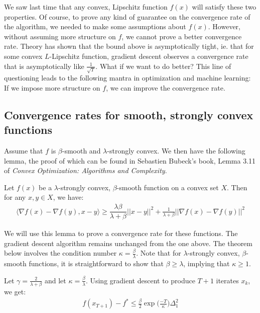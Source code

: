\documentclass[12pt]{report}
\begin{document}
We saw last time that any convex, Lipschitz function $f(x)$ will satisfy these two properties. Of course, to prove any kind of guarantee on the convergence rate of the algorithm, we needed to make some assumptions about $f(x)$. However, without assuming more structure on $f$, we cannot prove a better convergence rate. Theory has shown that the bound above is asymptotically tight, ie. that for some convex $L$-Lipschitz function, gradient descent observes a convergence rate that is asymptotically like $\frac{1}{\sqrt{T}}$. What if we want to do better? This line of questioning leads to the following mantra in optimization and machine learning: If we impose more structure on $f$, we can improve the convergence rate.

\subsection{Convergence rates for smooth, strongly convex functions}

Assume that $f$ is $\beta$-smooth and $\lambda$-strongly convex. We then have the following lemma, the proof of which can be found in Sebastien Bubeck's book, Lemma 3.11 of {\it Convex Optimization: Algorithms and Complexity}.

\begin{lemma}
Let $f(x)$ be a $\lambda$-strongly convex, $\beta$-smooth function on a convex set $X$. Then for any $x,y \in X$, we have:
\begin{align*}
\langle \nabla f(x) - \nabla f(y) , x-y \rangle \geq \dfrac{\lambda\beta}{\lambda+\beta}||x-y||^2 + \frac{1}{\lambda+\beta}||\nabla f(x) - \nabla f(y)||^2\end{align*}
\end{lemma}

We will use this lemma to prove a convergence rate for these functions. The gradient descent algorithm remains unchanged from the one above. The theorem below involves the condition number $\kappa = \frac{\beta}{\lambda}$. Note that for $\lambda$-strongly convex, $\beta$-smooth functions, it is straightforward to show that $\beta \geq \lambda$, implying that $\kappa \geq 1$.

\begin{theorem}
Let $\gamma = \frac{2}{\lambda + \beta}$ and let $\kappa = \frac{\beta}{\lambda}$. Using gradient descent to produce $T+1$ iterates $x_k$, we get:
\begin{align*}
f(x_{T+1}) - f^* \leq \frac{\beta}{2}\exp\bigg(\frac{-T}{\kappa}\bigg)\Delta_1^2\end{align*}
\end{theorem}
\end{document}
